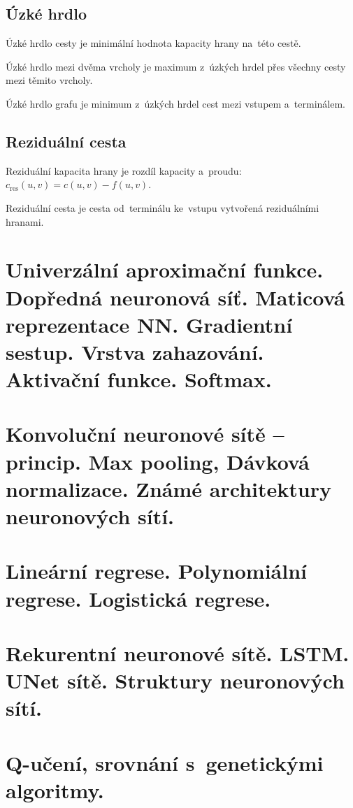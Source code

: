 \subsection{Úzké hrdlo}

Úzké hrdlo cesty je minimální hodnota kapacity hrany na~této cestě.

Úzké hrdlo mezi dvěma vrcholy je maximum z~úzkých hrdel přes všechny cesty mezi těmito vrcholy.

Úzké hrdlo grafu je minimum z~úzkých hrdel cest mezi vstupem a~terminálem.

\subsection{Reziduální cesta}

Reziduální kapacita hrany je rozdíl kapacity a~proudu: $c_\mathrm{res}(u,v) = c(u,v) - f(u,v)$.

Reziduální cesta je cesta od~terminálu ke~vstupu vytvořená reziduálními hranami.

\clearpage
\section{Univerzální aproximační funkce. Dopředná neuronová síť. Maticová reprezentace NN. Gradientní sestup. Vrstva zahazování. Aktivační funkce. Softmax.}


\clearpage
\section{Konvoluční neuronové sítě – princip. Max pooling, Dávková normalizace. Známé architektury neuronových sítí.}


\clearpage
\section{Lineární regrese. Polynomiální regrese. Logistická regrese.}


\clearpage
\section{Rekurentní neuronové sítě. LSTM. UNet sítě. Struktury neuronových sítí.}


\clearpage
\section{Q-učení, srovnání s~genetickými algoritmy.}


